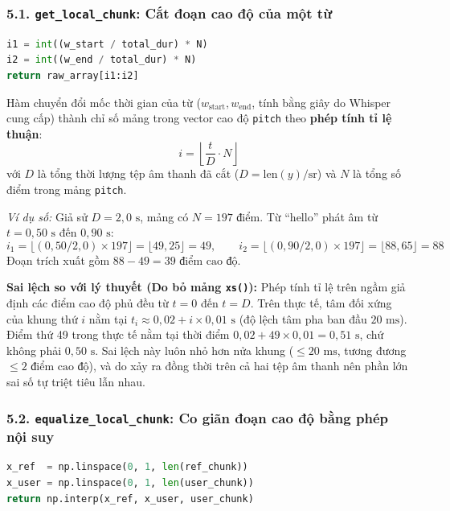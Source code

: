 \documentclass[11pt,a4paper]{article}
\begin{document}
\subsubsection*{5.1. \texttt{get\_local\_chunk}: Cắt đoạn cao độ của một từ}
\begin{lstlisting}[language=Python]
i1 = int((w_start / total_dur) * N)
i2 = int((w_end / total_dur) * N)
return raw_array[i1:i2]
\end{lstlisting}

Hàm chuyển đổi mốc thời gian của từ ($w_{\text{start}}, w_{\text{end}}$, tính bằng giây do Whisper cung cấp) thành chỉ số mảng trong vector cao độ \texttt{pitch} theo \textbf{phép tính tỉ lệ thuận}:
\begin{equation}
i = \left\lfloor \frac{t}{D} \cdot N \right\rfloor
\end{equation}
với $D$ là tổng thời lượng tệp âm thanh đã cắt ($D = \text{len}(y)/\text{sr}$) và $N$ là tổng số điểm trong mảng \texttt{pitch}.

\textit{Ví dụ số:} Giả sử $D = 2{,}0\text{ s}$, mảng có $N = 197\text{ điểm}$. Từ ``hello'' phát âm từ $t = 0{,}50\text{ s}$ đến $0{,}90\text{ s}$:
\[
i_1 = \lfloor (0{,}50 / 2{,}0) \times 197 \rfloor = \lfloor 49{,}25 \rfloor = 49, \qquad i_2 = \lfloor (0{,}90 / 2{,}0) \times 197 \rfloor = \lfloor 88{,}65 \rfloor = 88
\]
Đoạn trích xuất gồm $88 - 49 = 39\text{ điểm cao độ}$.

\textbf{Sai lệch so với lý thuyết (Do bỏ mảng \texttt{xs()}):} Phép tính tỉ lệ trên ngầm giả định các điểm cao độ phủ đều từ $t = 0$ đến $t = D$. Trên thực tế, tâm đối xứng của khung thứ $i$ nằm tại $t_i \approx 0{,}02 + i \times 0{,}01\text{ s}$ (độ lệch tâm pha ban đầu $20\text{ ms}$). Điểm thứ 49 trong thực tế nằm tại thời điểm $0{,}02 + 49 \times 0{,}01 = 0{,}51\text{ s}$, chứ không phải $0{,}50\text{ s}$. Sai lệch này luôn nhỏ hơn nửa khung ($\le 20\text{ ms}$, tương đương $\le 2\text{ điểm cao độ}$), và do xảy ra đồng thời trên cả hai tệp âm thanh nên phần lớn sai số tự triệt tiêu lẫn nhau.

\subsubsection*{5.2. \texttt{equalize\_local\_chunk}: Co giãn đoạn cao độ bằng phép nội suy}
\begin{lstlisting}[language=Python]
x_ref  = np.linspace(0, 1, len(ref_chunk))
x_user = np.linspace(0, 1, len(user_chunk))
return np.interp(x_ref, x_user, user_chunk)
\end{lstlisting}
\end{document}
